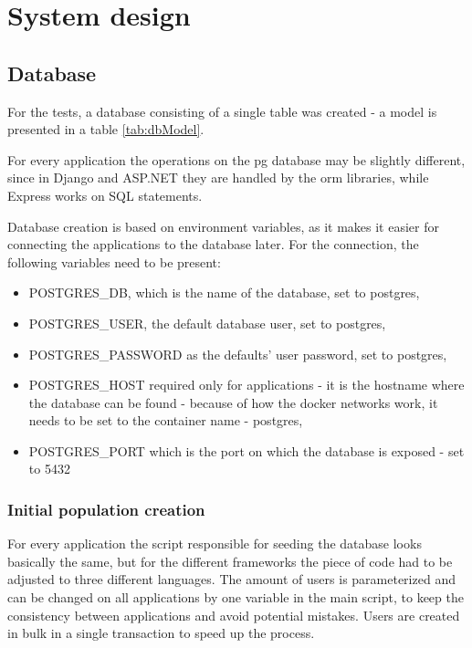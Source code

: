
\chapter{System design}

\section{Database}

For the tests, a database consisting of a single table was created - a model is presented in a table \ref{tab:dbModel}.



For every application the operations on the \acrlong{pg} database may be slightly different, since in Django and ASP.NET they are handled by the \acrlong{orm} libraries, while Express works on SQL statements.

Database creation is based on environment variables, as it makes it easier for connecting the applications to the database later. For the connection, the following variables need to be present:
\begin{itemize}
    \item POSTGRES\_DB, which is the name of the database, set to postgres,
    \item POSTGRES\_USER, the default database user, set to postgres,
    \item POSTGRES\_PASSWORD as the defaults' user password, set to postgres,
    \item POSTGRES\_HOST required only for applications - it is the hostname where the database can be found - because of how the docker networks work, it needs to be set to the container name - postgres,
    \item POSTGRES\_PORT which is the port on which the database is exposed - set to 5432
\end{itemize}

\subsection{Initial population creation}

For every application the script responsible for seeding the database looks basically the same, but for the different frameworks the piece of code had to be adjusted to three different languages. The amount of users is parameterized and can be changed on all applications by one variable in the main script, to keep the consistency between applications and avoid potential mistakes. Users are created in bulk in a single transaction to speed up the process.

